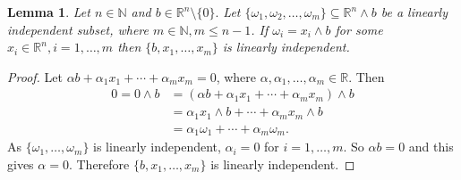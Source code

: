 \documentclass[11pt, a4paper, reqno]{amsart}
\numberwithin{equation}{section}
\newtheorem{lemma}[theorem]{Lemma}
\begin{document}
\begin{lemma}\label{ilem2}
Let $n\in \mathbb N$ and $b\in \mathbb R^n\setminus \{0\}.$ Let $\{\omega_1,\omega_2,\ldots, \omega_m\}\subseteq \mathbb R^n\wedge b$ be a linearly independent subset, where $m\in \mathbb N, m\leq n-1$. If $\omega_i=x_i\wedge b$  for some $x_i\in \mathbb R^n,i=1,\ldots,m$ then $\{b,x_1,\ldots,x_m\}$ is linearly independent.
\end{lemma}
\begin{proof}
Let $\alpha b+\alpha_1x_1+\cdots + \alpha_m x_m=0$, where $\alpha,\alpha_1,\ldots, \alpha_m \in \mathbb R.$ Then 
\begin{align*}
0=0\wedge b&=(\alpha b+\alpha_1x_1+\cdots +\alpha_mx_m)\wedge b\\
&=\alpha_1x_1\wedge b+\cdots +\alpha_mx_m\wedge b\\
&=\alpha_1\omega_1+\cdots +\alpha_m\omega_m.
\end{align*}
As $\{\omega_1,\ldots , \omega_m\}$ is  linearly independent, $\alpha_i=0$ for $i=1,\ldots, m.$ So $\alpha b=0$ and this gives $\alpha=0.$ Therefore $\{b,x_1,\ldots, x_m\}$ is linearly independent.
\end{proof}
\end{document}
